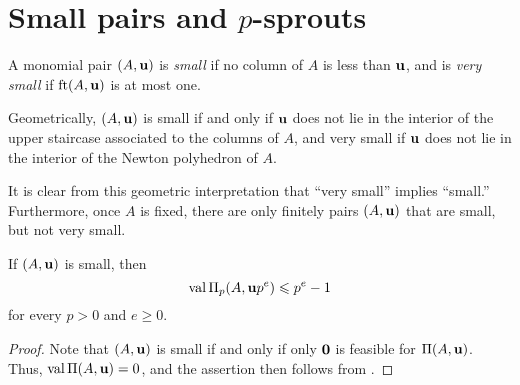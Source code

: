 \documentclass[11pt]{amsart}
\renewcommand{\!}[1]{{\color{red}\text{$\star$\,}#1\,$\star$}}
\begin{document}
\section{Small pairs and $p$-sprouts}

 
\begin{definition}
A monomial pair $(A, \mathbf{u})$ is \emph{small} if no column of $A$ is less than $\mathbf{u}$, and is \emph{very small} if $\operatorname{ft}(A, \mathbf{u})$ is at most one.
\end{definition}

\begin{remark}
\label{finitely many small but not very small: R}
Geometrically, $(A, \mathbf{u})$ is small if and only if $\mathbf{u}$ does not lie in the interior of the upper staircase associated to the columns of $A$, and very small if $\mathbf{u}$ does not lie in the interior of the Newton polyhedron of $A$.  

It is clear from this geometric interpretation that ``very small'' implies ``small.''  Furthermore, once $A$ is fixed, there are only finitely pairs $(A, \mathbf{u})$ that are small, but not very small. 
\end{remark}

\begin{lemma}
\label{trivial value bound: L}
If $(A, \mathbf{u})$ is small, then 
 \[ \operatorname{val} \Pi_p(A, \mathbf{u}p^e) \leqslant p^{e} -1 \] for every $p > 0$ and $e \geq 0$.
\end{lemma}


\begin{proof}
Note that $(A, \mathbf{u})$ is small if and only if only $\mathbf{0}$ is feasible for $\Pi(A, \mathbf{u})$.   Thus, $\operatorname{val} \Pi(A, \mathbf{u}) = 0$, and the assertion then follows from .
\end{proof}


\end{document}
